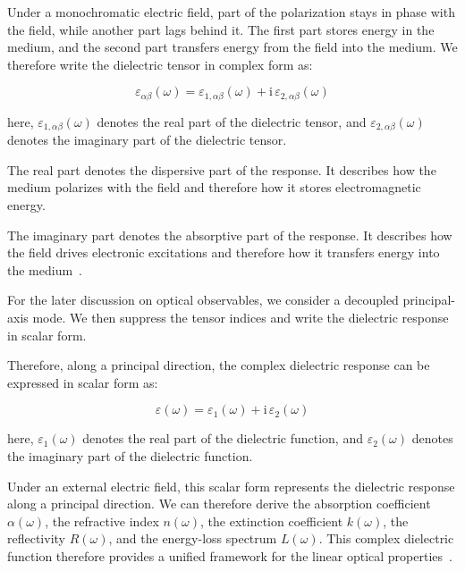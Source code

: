 Under a monochromatic electric field, part of the polarization stays in phase with the field,
while another part lags behind it.
The first part stores energy in the medium, and the second part transfers energy from the field into the medium.
We therefore write the dielectric tensor in complex form as:

\begin{equation}
    \varepsilon_{\alpha\beta}(\omega)
    = \varepsilon_{1,\alpha\beta}(\omega)
    + \mathrm{i}\,\varepsilon_{2,\alpha\beta}(\omega)
\label{complex_dielectric_tensor_definition}
\end{equation}

here, $\varepsilon_{1,\alpha\beta}(\omega)$ denotes the real part of the dielectric tensor,
and $\varepsilon_{2,\alpha\beta}(\omega)$ denotes the imaginary part of the dielectric tensor.

The real part denotes the dispersive part of the response.
It describes how the medium polarizes with the field and therefore how it stores electromagnetic energy.

The imaginary part denotes the absorptive part of the response.
It describes how the field drives electronic excitations and therefore how it transfers energy into the medium~\cite{ambrosch2006linear}.

For the later discussion on optical observables,
we consider a decoupled principal-axis mode.
We then suppress the tensor indices and write the dielectric response in scalar form.

Therefore, along a principal direction, the complex dielectric response can be expressed in scalar form as:

\begin{equation}
    \varepsilon(\omega)
    = \varepsilon_1(\omega)
    + \mathrm{i}\,\varepsilon_2(\omega)
\label{complex_dielectric_function_definition}
\end{equation}

here, $\varepsilon_1(\omega)$ denotes the real part of the dielectric function,
and $\varepsilon_2(\omega)$ denotes the imaginary part of the dielectric function.

Under an external electric field, this scalar form represents the dielectric response along a principal direction.
We can therefore derive the absorption coefficient $\alpha(\omega)$,
the refractive index $n(\omega)$,
the extinction coefficient $k(\omega)$,
the reflectivity $R(\omega)$,
and the energy-loss spectrum $L(\omega)$.
This complex dielectric function therefore provides a unified framework for the linear optical properties~\cite{onida2002electronic,djurivsic2002progress,niu2024electronic}.

